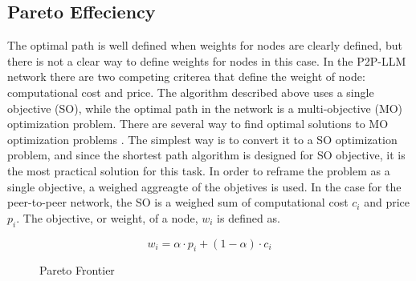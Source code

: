 \documentclass[preprint,twoside,11pt]{article}
\begin{document}
\subsection{Pareto Effeciency}

The optimal path is well defined when weights for nodes are clearly defined, but there is not a clear way to define
weights for nodes in this case. In the P2P-LLM network there are two competing criterea that define the weight of node: computational cost and price.
The algorithm described above uses a single objective (SO), while the optimal path in the network is a multi-objective (MO) optimization problem.
There are several way to find optimal solutions to MO optimization problems \citep{1599245}. The simplest way is to convert it to a SO optimization problem, and
since the shortest path algorithm is designed for SO objective, it is the most practical solution for this task. In order to reframe the problem as a single objective,
a weighed aggreagte of the objetives is used. In the case for the peer-to-peer network, the SO is a weighed sum of computational cost $c_i$ and price $p_i$.
The objective, or weight, of a node, $w_i$ is defined as.

\begin{equation}
	w_i = \alpha \cdot p_i + (1 - \alpha) \cdot c_i
	\label{eq:weight}
\end{equation}

\begin{figure}
	\centering
	\caption{Pareto Frontier}
	\label{fig:Pareto-optimal}
\end{figure}
\end{document}
